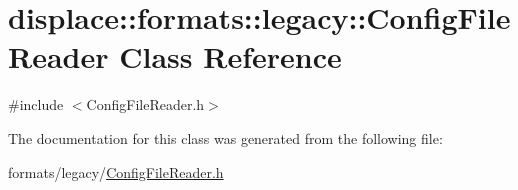 \hypertarget{classdisplace_1_1formats_1_1legacy_1_1_config_file_reader}{}\section{displace\+::formats\+::legacy\+::Config\+File\+Reader Class Reference}
\label{classdisplace_1_1formats_1_1legacy_1_1_config_file_reader}


{\ttfamily \#include $<$Config\+File\+Reader.\+h$>$}



The documentation for this class was generated from the following file\+:\begin{DoxyCompactItemize}
\item 
formats/legacy/\mbox{\hyperlink{_config_file_reader_8h}{Config\+File\+Reader.\+h}}\end{DoxyCompactItemize}
